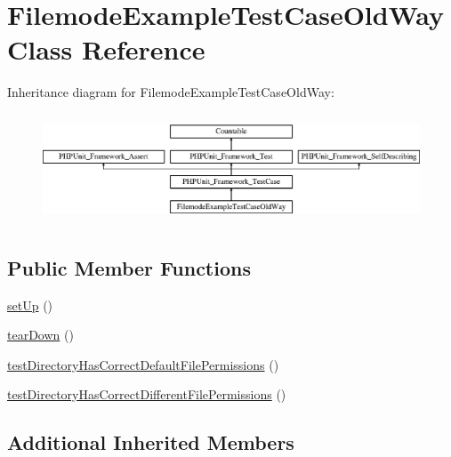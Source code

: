 \hypertarget{classorg_1_1bovigo_1_1vfs_1_1example_1_1_filemode_example_test_case_old_way}{}\section{Filemode\+Example\+Test\+Case\+Old\+Way Class Reference}
\label{classorg_1_1bovigo_1_1vfs_1_1example_1_1_filemode_example_test_case_old_way}
Inheritance diagram for Filemode\+Example\+Test\+Case\+Old\+Way\+:\begin{figure}[H]
\begin{center}
\leavevmode
\includegraphics[height=3.303835cm]{classorg_1_1bovigo_1_1vfs_1_1example_1_1_filemode_example_test_case_old_way}
\end{center}
\end{figure}
\subsection*{Public Member Functions}
\begin{DoxyCompactItemize}
\item 
\mbox{\hyperlink{classorg_1_1bovigo_1_1vfs_1_1example_1_1_filemode_example_test_case_old_way_a0bc688732d2b3b162ffebaf7812e78da}{set\+Up}} ()
\item 
\mbox{\hyperlink{classorg_1_1bovigo_1_1vfs_1_1example_1_1_filemode_example_test_case_old_way_a80fe3d17e658907fc75346a0ec9d6fc7}{tear\+Down}} ()
\item 
\mbox{\hyperlink{classorg_1_1bovigo_1_1vfs_1_1example_1_1_filemode_example_test_case_old_way_a3aa2359c4a87c178ac40ed351d0a9cd3}{test\+Directory\+Has\+Correct\+Default\+File\+Permissions}} ()
\item 
\mbox{\hyperlink{classorg_1_1bovigo_1_1vfs_1_1example_1_1_filemode_example_test_case_old_way_a8e2c616bfe1e89afd3553369e04f5b0b}{test\+Directory\+Has\+Correct\+Different\+File\+Permissions}} ()
\end{DoxyCompactItemize}
\subsection*{Additional Inherited Members}


